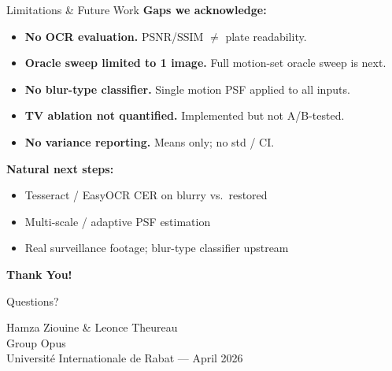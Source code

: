\documentclass[aspectratio=169,11pt]{beamer}
\begin{document}
\begin{frame}{Limitations \& Future Work}
\textbf{Gaps we acknowledge:}
\begin{itemize}\setlength{\itemsep}{2pt}
  \item[\textbf{(1)}] \textbf{No OCR evaluation.} PSNR/SSIM $\ne$ plate readability.
  \item[\textbf{(2)}] \textbf{Oracle sweep limited to 1 image.} Full motion-set oracle sweep is next.
  \item[\textbf{(3)}] \textbf{No blur-type classifier.} Single motion PSF applied to all inputs.
  \item[\textbf{(4)}] \textbf{TV ablation not quantified.} Implemented but not A/B-tested.
  \item[\textbf{(5)}] \textbf{No variance reporting.} Means only; no std / CI.
\end{itemize}

\vspace{0.3cm}
\textbf{Natural next steps:}
\begin{itemize}\setlength{\itemsep}{2pt}
  \item Tesseract / EasyOCR CER on blurry vs.\ restored
  \item Multi-scale / adaptive PSF estimation
  \item Real surveillance footage; blur-type classifier upstream
\end{itemize}
\end{frame}

\begin{frame}
\begin{center}
\Huge \textbf{Thank You!}

\vspace{1cm}
\large Questions?

\vspace{1cm}
\normalsize
Hamza Ziouine \& Leonce Theureau \\
Group Opus \\[0.2cm]
\small Universit\'e Internationale de Rabat --- April 2026
\end{center}
\end{frame}
\end{document}
